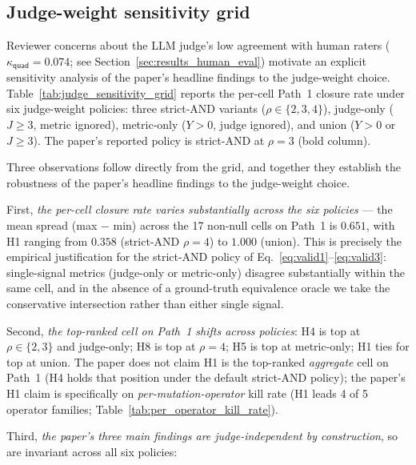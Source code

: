 \subsection{Judge-weight sensitivity grid}
\label{sec:results_judge_sensitivity}

Reviewer concerns about the LLM judge's low agreement with human raters ($\kappa_{\textsf{quad}} = 0.074$; see Section~\ref{sec:results_human_eval}) motivate an explicit sensitivity analysis of the paper's headline findings to the judge-weight choice. Table~\ref{tab:judge_sensitivity_grid} reports the per-cell Path~1 closure rate under six judge-weight policies: three strict-AND variants ($\rho \in \{2, 3, 4\}$), judge-only ($J \geq 3$, metric ignored), metric-only ($Y > 0$, judge ignored), and union ($Y > 0$ or $J \geq 3$). The paper's reported policy is strict-AND at $\rho = 3$ (bold column).



Three observations follow directly from the grid, and together they establish the robustness of the paper's headline findings to the judge-weight choice.

First, \emph{the per-cell closure rate varies substantially across the six policies} --- the mean spread (max $-$ min) across the 17 non-null cells on Path~1 is $0.651$, with H1 ranging from $0.358$ (strict-AND $\rho = 4$) to $1.000$ (union). This is precisely the empirical justification for the strict-AND policy of Eq.~\ref{eq:valid1}--\ref{eq:valid3}: single-signal metrics (judge-only or metric-only) disagree substantially within the same cell, and in the absence of a ground-truth equivalence oracle we take the conservative intersection rather than either single signal.

Second, \emph{the top-ranked cell on Path~1 shifts across policies}: H4 is top at $\rho \in \{2, 3\}$ and judge-only; H8 is top at $\rho = 4$; H5 is top at metric-only; H1 ties for top at union. The paper does not claim H1 is the top-ranked \emph{aggregate} cell on Path~1 (H4 holds that position under the default strict-AND policy); the paper's H1 claim is specifically on \emph{per-mutation-operator} kill rate (H1 leads 4 of 5 operator families; Table~\ref{tab:per_operator_kill_rate}).

Third, \emph{the paper's three main findings are judge-independent by construction}, so are invariant across all six policies:

